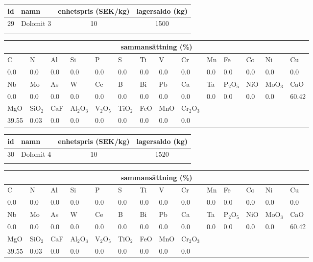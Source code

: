 \begin{center}
{\scriptsize\addtolength{\tabcolsep}{-3pt}
\begin{tabular}{clcc}
id&namn&enhetspris (SEK/kg)&lagersaldo (kg)\\
\hline
29&Dolomit 3&10&1500\\\\
\end{tabular}
\begin{tabular}{llllllllllllll}
\multicolumn{14}{c}{sammansättning (\%)}\\
\hline
C&N&Al&Si&P&S&Ti&V&Cr&Mn&Fe&Co&Ni&Cu\\
\hline
0.0&0.0&0.0&0.0& 0.0&0.0&0.0&0.0& 0.0&0.0&0.0&0.0& 0.0&0.0\\
\hline
Nb&Mo&As&W&Ce&B&Bi&Pb&Ca&Ta&P$_2$O$_5$&NiO&MoO$_3$&CaO\\
\hline
0.0& 0.0& 0.0& 0.0& 0.0& 0.0& 0.0& 0.0& 0.0& 0.0& 0.0& 0.0& 0.0& 60.42\\
\hline
MgO&SiO$_2$&CaF&Al$_2$O$_3$&V$_2$O$_5$&TiO$_2$&FeO&MnO&Cr$_2$O$_3$\\
\hline
39.55& 0.03& 0.0& 0.0& 0.0& 0.0& 0.0& 0.0& 0.0\\
\end{tabular}
}
\end{center}

\begin{center}
{\scriptsize\addtolength{\tabcolsep}{-3pt}
\begin{tabular}{clcc}
id&namn&enhetspris (SEK/kg)&lagersaldo (kg)\\
\hline
30&Dolomit 4&10&1520\\\\
\end{tabular}
\begin{tabular}{llllllllllllll}
\multicolumn{14}{c}{sammansättning (\%)}\\
\hline
C&N&Al&Si&P&S&Ti&V&Cr&Mn&Fe&Co&Ni&Cu\\
\hline
0.0&0.0&0.0&0.0& 0.0&0.0&0.0&0.0& 0.0&0.0&0.0&0.0& 0.0&0.0\\
\hline
Nb&Mo&As&W&Ce&B&Bi&Pb&Ca&Ta&P$_2$O$_5$&NiO&MoO$_3$&CaO\\
\hline
0.0& 0.0& 0.0& 0.0& 0.0& 0.0& 0.0& 0.0& 0.0& 0.0& 0.0& 0.0& 0.0& 60.42\\
\hline
MgO&SiO$_2$&CaF&Al$_2$O$_3$&V$_2$O$_5$&TiO$_2$&FeO&MnO&Cr$_2$O$_3$\\
\hline
39.55& 0.03& 0.0& 0.0& 0.0& 0.0& 0.0& 0.0& 0.0\\
\end{tabular}
}
\end{center}


